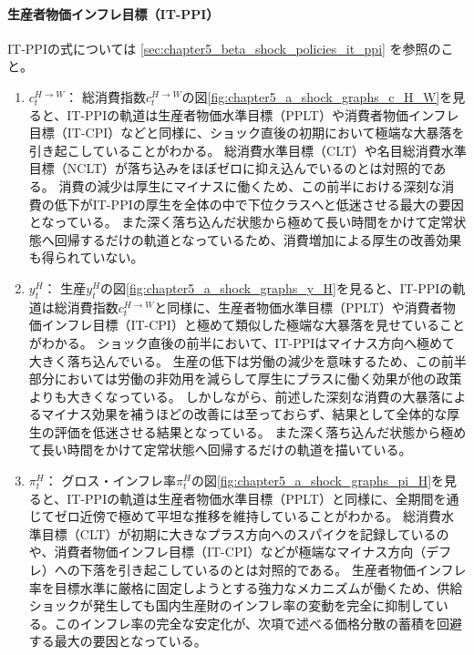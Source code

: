 \paragraph{生産者物価インフレ目標（IT-PPI）}
\label{sec:chapter5_a_shock_policies_it_ppi}
IT-PPIの式については
\ref{sec:chapter5_beta_shock_policies_it_ppi}
を参照のこと。
\begin{enumerate}
    \item
    \label{itm:chapter5_a_shock_policies_it_ppi_c_H_W}
        \(c_t^{H\to W}\)：
        総消費指数\(c_t^{H\to W}\)の図\ref{fig:chapter5_a_shock_graphs_c_H_W}を見ると、IT-PPIの軌道は生産者物価水準目標（PPLT）や消費者物価インフレ目標（IT-CPI）などと同様に、ショック直後の初期において極端な大暴落を引き起こしていることがわかる。
        総消費水準目標（CLT）や名目総消費水準目標（NCLT）が落ち込みをほぼゼロに抑え込んでいるのとは対照的である。
        消費の減少は厚生にマイナスに働くため、この前半における深刻な消費の低下がIT-PPIの厚生を全体の中で下位クラスへと低迷させる最大の要因となっている。
        また深く落ち込んだ状態から極めて長い時間をかけて定常状態へ回帰するだけの軌道となっているため、消費増加による厚生の改善効果も得られていない。
    \item
    \label{itm:chapter5_a_shock_policies_it_ppi_y_H}
        \(y_t^H\)：
        生産\(y_t^H\)の図\ref{fig:chapter5_a_shock_graphs_y_H}を見ると、IT-PPIの軌道は総消費指数\(c_t^{H\to W}\)と同様に、生産者物価水準目標（PPLT）や消費者物価インフレ目標（IT-CPI）と極めて類似した極端な大暴落を見せていることがわかる。
        ショック直後の前半において、IT-PPIはマイナス方向へ極めて大きく落ち込んでいる。
        生産の低下は労働の減少を意味するため、この前半部分においては労働の非効用を減らして厚生にプラスに働く効果が他の政策よりも大きくなっている。
        しかしながら、前述した深刻な消費の大暴落によるマイナス効果を補うほどの改善には至っておらず、結果として全体的な厚生の評価を低迷させる結果となっている。
        また深く落ち込んだ状態から極めて長い時間をかけて定常状態へ回帰するだけの軌道を描いている。
    \item
    \label{itm:chapter5_a_shock_policies_it_ppi_pi_H}
        \(\pi_t^H\)：
        グロス・インフレ率\(\pi_t^H\)の図\ref{fig:chapter5_a_shock_graphs_pi_H}を見ると、IT-PPIの軌道は生産者物価水準目標（PPLT）と同様に、全期間を通じてゼロ近傍で極めて平坦な推移を維持していることがわかる。
        総消費水準目標（CLT）が初期に大きなプラス方向へのスパイクを記録しているのや、消費者物価インフレ目標（IT-CPI）などが極端なマイナス方向（デフレ）への下落を引き起こしているのとは対照的である。
        生産者物価インフレ率を目標水準に厳格に固定しようとする強力なメカニズムが働くため、供給ショックが発生しても国内生産財のインフレ率の変動を完全に抑制している。このインフレ率の完全な安定化が、次項で述べる価格分散の蓄積を回避する最大の要因となっている。

\end{enumerate}
